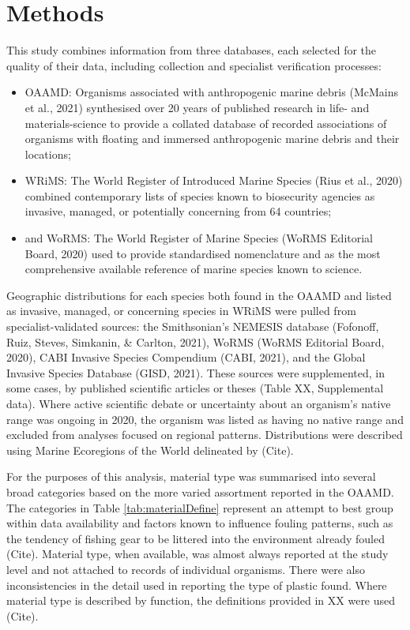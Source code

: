 \documentclass[a4paper, nobind]{templates/ociamthesis}
\providecommand{\tightlist}{%
  \setlength{\itemsep}{0pt}\setlength{\parskip}{0pt}}
\begin{document}
\hypertarget{methods-1}{%
\section{Methods}\label{methods-1}}

This study combines information from three databases, each selected for the quality of their data, including collection and specialist verification processes:

\begin{itemize}
\tightlist
\item
  OAAMD: Organisms associated with anthropogenic marine debris (McMains et al., 2021) synthesised over 20 years of published research in life- and materials-science to provide a collated database of recorded associations of organisms with floating and immersed anthropogenic marine debris and their locations;
\item
  WRiMS: The World Register of Introduced Marine Species (Rius et al., 2020) combined contemporary lists of species known to biosecurity agencies as invasive, managed, or potentially concerning from 64 countries;
\item
  and WoRMS: The World Register of Marine Species (WoRMS Editorial Board, 2020) used to provide standardised nomenclature and as the most comprehensive available reference of marine species known to science.
\end{itemize}

Geographic distributions for each species both found in the OAAMD and listed as invasive, managed, or concerning species in WRiMS were pulled from specialist-validated sources: the Smithsonian's NEMESIS database (Fofonoff, Ruiz, Steves, Simkanin, \& Carlton, 2021), WoRMS (WoRMS Editorial Board, 2020), CABI Invasive Species Compendium (CABI, 2021), and the Global Invasive Species Database (GISD, 2021). These sources were supplemented, in some cases, by published scientific articles or theses (Table XX, Supplemental data). Where active scientific debate or uncertainty about an organism's native range was ongoing in 2020, the organism was listed as having no native range and excluded from analyses focused on regional patterns. Distributions were described using Marine Ecoregions of the World delineated by (Cite).

For the purposes of this analysis, material type was summarised into several broad categories based on the more varied assortment reported in the OAAMD. The categories in Table \ref{tab:materialDefine} represent an attempt to best group within data availability and factors known to influence fouling patterns, such as the tendency of fishing gear to be littered into the environment already fouled (Cite). Material type, when available, was almost always reported at the study level and not attached to records of individual organisms. There were also inconsistencies in the detail used in reporting the type of plastic found. Where material type is described by function, the definitions provided in XX were used (Cite).
\end{document}
